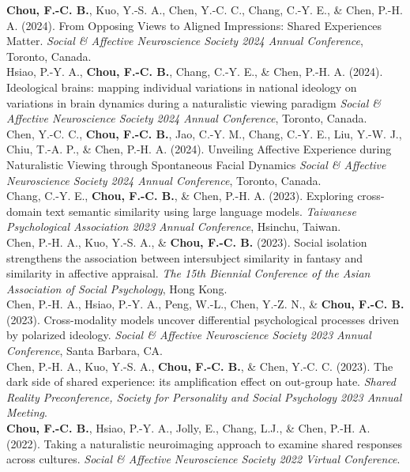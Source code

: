 \documentclass[a4paper,12pt]{article}
\newcommand{\itemspace}{7pt} %
\begin{document}
\noindent\textbf{Chou, F.-C. B.}, Kuo, Y.-S. A., Chen, Y.-C. C., Chang, C.-Y. E., \& Chen, P.-H. A. (2024). From Opposing Views to Aligned Impressions: Shared Experiences Matter. \textit{Social \& Affective Neuroscience Society 2024 Annual Conference}, Toronto, Canada. \\[\itemspace]
\noindent Hsiao, P.-Y. A., \textbf{Chou, F.-C. B.}, Chang, C.-Y. E., \& Chen, P.-H. A. (2024). Ideological brains: mapping individual variations in national ideology on variations in brain dynamics during a naturalistic viewing paradigm \textit{Social \& Affective Neuroscience Society 2024 Annual Conference}, Toronto, Canada. \\[\itemspace]
\noindent Chen, Y.-C. C., \textbf{Chou, F.-C. B.}, Jao, C.-Y. M., Chang, C.-Y. E., Liu, Y.-W. J., Chiu, T.-A. P., \& Chen, P.-H. A. (2024). Unveiling Affective Experience during Naturalistic Viewing through Spontaneous Facial Dynamics \textit{Social \& Affective Neuroscience Society 2024 Annual Conference}, Toronto, Canada. \\[\itemspace]
\noindent Chang, C.-Y. E., \textbf{Chou, F.-C. B.}, \& Chen, P.-H. A. (2023). Exploring cross-domain text semantic similarity using large language models. \textit{Taiwanese Psychological Association 2023 Annual Conference}, Hsinchu, Taiwan.\\[\itemspace]
\noindent Chen, P.-H. A., Kuo, Y.-S. A., \& \textbf{Chou, F.-C. B.} (2023). Social isolation strengthens the association between intersubject similarity in fantasy and similarity in affective appraisal. \textit{The 15th Biennial Conference of the Asian Association of Social Psychology}, Hong Kong.\\[\itemspace]
\noindent Chen, P.-H. A., Hsiao, P.-Y. A., Peng, W.-L., Chen, Y.-Z. N., \& \textbf{Chou, F.-C. B.} (2023). Cross-modality models uncover differential psychological processes driven by polarized ideology. \textit{Social \& Affective Neuroscience Society 2023 Annual Conference}, Santa Barbara, CA.\\[\itemspace]
\noindent Chen, P.-H. A., Kuo, Y.-S. A., \textbf{Chou, F.-C. B.}, \& Chen, Y.-C. C. (2023). The dark side of shared experience: its amplification effect on out-group hate. \textit{Shared Reality Preconference, Society for Personality and Social Psychology 2023 Annual Meeting}.\\[\itemspace]
\noindent \textbf{Chou, F.-C. B.}, Hsiao, P.-Y. A., Jolly, E., Chang, L.J., \& Chen, P.-H. A. (2022). Taking a naturalistic neuroimaging approach to examine shared responses across cultures. \textit{Social \& Affective Neuroscience Society 2022 Virtual Conference}.\\[\itemspace]
\end{document}
